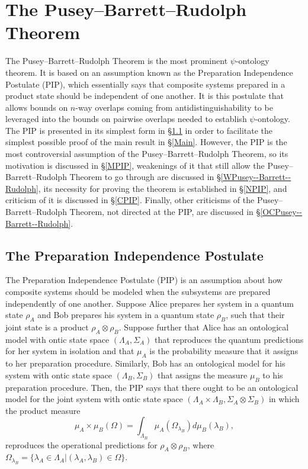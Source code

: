 \documentclass[DIV=calc,paper=a4,fontsize=11pt,twocolumn]{scrartcl} %
\theoremstyle{definition}
\theoremstyle{plain}
\begin{document}
\section{The Pusey--Barrett--Rudolph Theorem}

\label{Pusey--Barrett--Rudolph}

The Pusey--Barrett--Rudolph Theorem is the most prominent $\psi$-ontology theorem.  It is
based on an assumption known as the Preparation Independence Postulate
(PIP), which essentially says that composite systems prepared in a
product state should be independent of one another.  It is this
postulate that allows bounds on $n$-way overlaps coming from
antidistinguishability to be leveraged into the bounds on pairwise
overlaps needed to establish $\psi$-ontology.  The PIP is presented in
its simplest form in \S\ref{PIP} in order to facilitate the simplest
possible proof of the main result in \S\ref{Main}.  However, the PIP
is the most controversial assumption of the Pusey--Barrett--Rudolph Theorem, so its
motivation is discussed in \S\ref{MPIP}, weakenings of it that still
allow the Pusey--Barrett--Rudolph Theorem to go through are discussed in \S\ref{WPusey--Barrett--Rudolph}, its
necessity for proving the theorem is established in \S\ref{NPIP}, and
criticism of it is discussed in \S\ref{CPIP}.  Finally, other
criticisms of the Pusey--Barrett--Rudolph Theorem, not directed at the PIP, are discussed
in \S\ref{OCPusey--Barrett--Rudolph}.


\subsection{The Preparation Independence Postulate}

\label{PIP}

The Preparation Independence Postulate (PIP) is an assumption about
how composite systems should be modeled when the subsystems are
prepared independently of one another.  Suppose Alice prepares her
system in a quantum state $\rho_A$ and Bob prepares his system in a
quantum state $\rho_B$, such that their joint state is a product
$\rho_A \otimes \rho_B$.  Suppose further that Alice has an
ontological model with ontic state space $(\Lambda_A,\Sigma_A)$ that
reproduces the quantum predictions for her system in isolation and
that $\mu_A$ is the probability measure that it assigns to her
preparation procedure.  Similarly, Bob has an ontological model for
his system with ontic state space $(\Lambda_B,\Sigma_B)$ that assigns
the measure $\mu_B$ to his preparation procedure.  Then, the PIP says
that there ought to be an ontological model for the joint system with
ontic state space $(\Lambda_A \times \Lambda_B, \Sigma_A \otimes
\Sigma_B)$ in which the product measure
\begin{equation}
\mu_A \times \mu_B(\Omega) = \int_{\Lambda_B}
\mu_A(\Omega_{\lambda_B}) d \mu_B(\lambda_B),
\end{equation}
reproduces the operational predictions for $\rho_A \otimes \rho_B$,
where $\Omega_{\lambda_B} = \{\lambda_A \in \Lambda_A |
(\lambda_A,\lambda_B) \in \Omega \}$.
\end{document}
